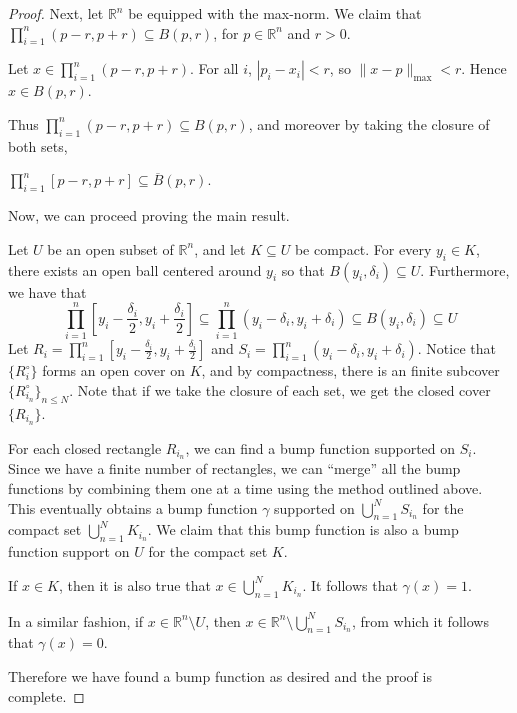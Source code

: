 \documentclass{article}
\newcommand{\cl}[1]{\overline{#1}}
\theoremstyle{plain} %
\numberwithin{thm}{section} %
\theoremstyle{definition}
\begin{document}
\begin{proof}
		Next, let \(\mathbb{R}^n\) be equipped with the max-norm. We claim that \(\prod _{i=1}^n (p-r,p+r) \subseteq B(p,r)\), for \(p \in \mathbb{R}^n\) and \(r > 0\).

		Let \(x \in \prod _{i=1}^n (p-r,p+r)\). For all \(i\), \(|p_i - x_i| < r\), so \(\|x - p\| _{\max} < r\). Hence \(x \in B(p, r)\).

		Thus \(\prod _{i=1}^n (p-r,p+r) \subseteq B(p,r)\), and moreover by taking the closure of both sets,
		
		\(\prod _{i=1}^n [p-r,p+r] \subseteq \cl{B}(p,r)\).
		
		Now, we can proceed proving the main result.

		Let \(U\) be an open subset of \(\mathbb{R}^n\), and let \(K \subseteq U\) be compact. For every \(y_i \in K\), there exists an open ball centered around \(y_i\) so that \(B(y_i, \delta_i) \subseteq U\). Furthermore, we have that
		\[
			\prod _{i=1}^n \left[y_i - \frac{\delta_i}{2}, y_i + \frac{\delta_i}{2}\right] \subseteq \prod _{i=1}^n (y_i - \delta_i , y_i + \delta_i) \subseteq B(y_i, \delta_i) \subseteq U
		\]
		Let \(R_i = \prod _{i=1}^n \left[y_i - \frac{\delta_i}{2}, y_i + \frac{\delta_i}{2}\right]\) and \(S_i = \prod _{i=1}^n (y_i - \delta_i , y_i + \delta_i)\). Notice that \(\{R_i^{\circ}\}\) forms an open cover on \(K\), and by compactness, there is an finite subcover \(\{R_{i_n}^{\circ}\}_{n \leq N}\). Note that if we take the closure of each set, we get the closed cover \(\{R_{i_n}\}\).
		
		For each closed rectangle \(R_{i_n}\), we can find a bump function supported on \(S_i\). Since we have a finite number of rectangles, we can ``merge'' all the bump functions by combining them one at a time using the method outlined above. This eventually obtains a bump function \(\gamma\) supported on \(\bigcup_{n=1}^{N} S_{i_n}\) for the compact set \(\bigcup_{n=1}^{N} K_{i_n}\). We claim that this bump function is also a bump function support on \(U\) for the compact set \(K\).

		If \(x \in K\), then it is also true that \(x \in \bigcup_{n=1}^{N} K_{i_n}\). It follows that \(\gamma (x) = 1\).

		In a similar fashion, if \(x \in \mathbb{R}^n \setminus U\), then \(x \in \mathbb{R}^n \setminus \bigcup_{n=1}^{N} S_{i_n}\), from which it follows that \(\gamma (x) = 0\).

		Therefore we have found a bump function as desired and the proof is complete.
        \end{proof}
        \newpage
\end{document}
